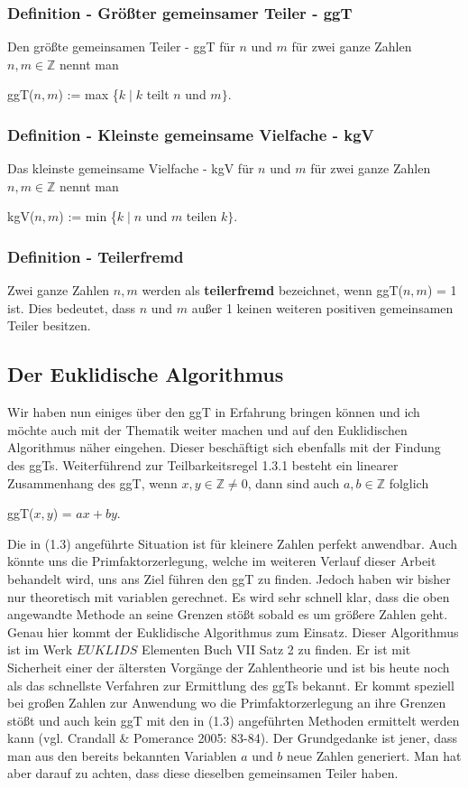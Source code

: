 \documentclass[german,12pt,a4paper]{article}
\begin{document}
\subsubsection{Definition - Größter gemeinsamer Teiler - ggT}
Den größte gemeinsamen Teiler - ggT für $n$ und $m$ für zwei ganze Zahlen $n, m\in \mathbb{Z}$ nennt man
\begin{center}
ggT($n, m$) := max \{$k \mid k$ teilt $n$ und $m\}$.
\end{center}
\subsubsection{Definition - Kleinste gemeinsame Vielfache - kgV}
Das kleinste gemeinsame Vielfache - kgV für $n$ und $m$ für zwei ganze Zahlen $n, m\in \mathbb{Z}$ nennt man
\begin{center}
kgV($n, m$) := min \{$k \mid n$ und $m$ teilen $k\}$.
\end{center}
\subsubsection{Definition - Teilerfremd}
Zwei ganze Zahlen $n, m$ werden als \textbf{teilerfremd} bezeichnet, wenn ggT($n, m$) = 1 ist. Dies bedeutet, dass $n$ und $m$ außer 1 keinen weiteren positiven gemeinsamen Teiler besitzen.

\subsection{Der Euklidische Algorithmus}
Wir haben nun einiges über den ggT in Erfahrung bringen können und ich möchte auch mit der Thematik weiter machen und auf den Euklidischen Algorithmus näher eingehen. Dieser beschäftigt sich ebenfalls mit der Findung des ggTs.\newline
Weiterführend zur Teilbarkeitsregel 1.3.1 besteht ein linearer Zusammenhang des ggT, wenn $x, y \in \mathbb{Z} \neq 0$, dann sind auch $a, b \in \mathbb{Z}$ folglich
\begin{center}
ggT($x, y$) = $ax + by$.
\end{center}
Die in (1.3) angeführte Situation ist für kleinere Zahlen perfekt anwendbar. Auch könnte uns die Primfaktorzerlegung, welche im weiteren Verlauf dieser Arbeit behandelt wird, uns ans Ziel führen den ggT zu finden. Jedoch haben wir bisher nur theoretisch mit variablen gerechnet. Es wird sehr schnell klar, dass die oben angewandte Methode an seine Grenzen stößt sobald es um größere Zahlen geht. Genau hier kommt der Euklidische Algorithmus zum Einsatz. Dieser Algorithmus ist im Werk $EUKLIDS$ Elementen Buch VII Satz 2 zu finden. Er ist mit Sicherheit einer der ältersten Vorgänge der Zahlentheorie und ist bis heute noch als das schnellste Verfahren zur Ermittlung des ggTs bekannt. Er kommt speziell bei großen Zahlen zur Anwendung wo die Primfaktorzerlegung an ihre Grenzen stößt und auch kein ggT mit den in (1.3) angeführten Methoden ermittelt werden kann (vgl. Crandall \& Pomerance 2005: 83-84).\newline
Der Grundgedanke ist jener, dass man aus den bereits bekannten Variablen $a$ und $b$ neue Zahlen generiert. Man hat aber darauf zu achten, dass diese dieselben gemeinsamen Teiler haben.
\end{document}
